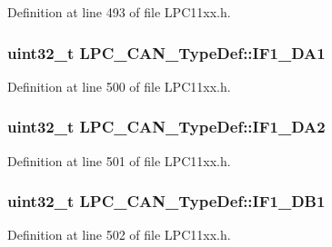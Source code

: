 Definition at line 493 of file L\+P\+C11xx.\+h.

\subsubsection[{\texorpdfstring{I\+F1\+\_\+\+D\+A1}{IF1_DA1}}]{ uint32\+\_\+t L\+P\+C\+\_\+\+C\+A\+N\+\_\+\+Type\+Def\+::\+I\+F1\+\_\+\+D\+A1}\hypertarget{group___l_p_c11xx___definitions_ga7c33859386353ab630c9103410551b08}{}\label{group___l_p_c11xx___definitions_ga7c33859386353ab630c9103410551b08}


Definition at line 500 of file L\+P\+C11xx.\+h.

\subsubsection[{\texorpdfstring{I\+F1\+\_\+\+D\+A2}{IF1_DA2}}]{ uint32\+\_\+t L\+P\+C\+\_\+\+C\+A\+N\+\_\+\+Type\+Def\+::\+I\+F1\+\_\+\+D\+A2}\hypertarget{group___l_p_c11xx___definitions_gadd4a84037c610c93a86d6584efb55d66}{}\label{group___l_p_c11xx___definitions_gadd4a84037c610c93a86d6584efb55d66}


Definition at line 501 of file L\+P\+C11xx.\+h.

\subsubsection[{\texorpdfstring{I\+F1\+\_\+\+D\+B1}{IF1_DB1}}]{ uint32\+\_\+t L\+P\+C\+\_\+\+C\+A\+N\+\_\+\+Type\+Def\+::\+I\+F1\+\_\+\+D\+B1}\hypertarget{group___l_p_c11xx___definitions_ga79bfadf7004722f5a0776f5229e341ce}{}\label{group___l_p_c11xx___definitions_ga79bfadf7004722f5a0776f5229e341ce}


Definition at line 502 of file L\+P\+C11xx.\+h.

